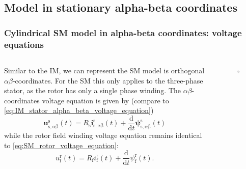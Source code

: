 \subsection{Model in stationary alpha-beta coordinates}

\begin{frame}
	\frametitle{Cylindrical SM model in alpha-beta coordinates: voltage equations}
    \begin{columns}
		\begin{column}{0.55\textwidth}
	       Similar to the IM, we can represent the SM model is orthogonal $\alpha\beta$-coordinates. For the SM this only applies to the three-phase stator, as the rotor has only a single phase winding. The $\alpha\beta$-coordinates voltage equation is given by (compare to \eqref{eq:IM_stator_alpha_beta_voltage_equation})
		   \begin{equation}
			\bm{u}^\mathrm{s}_\mathrm{s,\alpha\beta}(t) = R_\mathrm{s} \bm{i}^\mathrm{s}_\mathrm{s,\alpha\beta}(t)+ \frac{\mathrm{d}}{\mathrm{d}t}\bm{\psi}^\mathrm{s}_\mathrm{s,\alpha\beta}(t)
		   \end{equation}
		   \onslide<2->
		   while the rotor field winding voltage equation remains identical to \eqref{eq:SM_rotor_voltage_equation}:
		   $$
			u^\mathrm{r}_\mathrm{f}(t) = R_\mathrm{f}i^\mathrm{r}_\mathrm{f}(t)+\frac{\mathrm{d}}{\mathrm{d}t}\psi^\mathrm{r}_\mathrm{f}(t).
			$$
        \end{column}
        \begin{column}{0.45\textwidth}
            \begin{figure}
                \centering
                \includegraphics[width=0.85\textwidth]{fig/lec07/SM_cylindrical_rotor_alpha_beta.pdf}

\end{figure}
\end{column}
\end{columns}
\end{frame}
